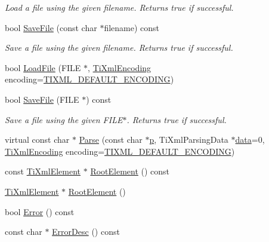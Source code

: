 \begin{DoxyCompactItemize}
\begin{DoxyCompactList}\small\item\em Load a file using the given filename. Returns true if successful. \end{DoxyCompactList}\item 
bool \hyperlink{class_ti_xml_document_ae869f5ebf7fc54c4a1d737fb4689fd44}{Save\-File} (const char $\ast$filename) const 
\begin{DoxyCompactList}\small\item\em Save a file using the given filename. Returns true if successful. \end{DoxyCompactList}\item 
bool \hyperlink{class_ti_xml_document_a41f6fe7200864d1dca663d230caf8db6}{Load\-File} (F\-I\-L\-E $\ast$, \hyperlink{tinyxml_8h_a88d51847a13ee0f4b4d320d03d2c4d96}{Ti\-Xml\-Encoding} encoding=\hyperlink{tinyxml_8h_ad5b8b092878e9010d6400cb6c13d4879}{T\-I\-X\-M\-L\-\_\-\-D\-E\-F\-A\-U\-L\-T\-\_\-\-E\-N\-C\-O\-D\-I\-N\-G})
\item 
bool \hyperlink{class_ti_xml_document_acf1672b4538c6d1d441f9f108aea2bf4}{Save\-File} (F\-I\-L\-E $\ast$) const 
\begin{DoxyCompactList}\small\item\em Save a file using the given F\-I\-L\-E$\ast$. Returns true if successful. \end{DoxyCompactList}\item 
virtual const char $\ast$ \hyperlink{class_ti_xml_document_a17ebabe36926ef398e78dec0d0ad0378}{Parse} (const char $\ast$\hyperlink{glew_8h_aa5367c14d90f462230c2611b81b41d23}{p}, Ti\-Xml\-Parsing\-Data $\ast$\hyperlink{fmod__codec_8h_a42c2b1d86fa71a425e73a882cb0a72c8}{data}=0, \hyperlink{tinyxml_8h_a88d51847a13ee0f4b4d320d03d2c4d96}{Ti\-Xml\-Encoding} encoding=\hyperlink{tinyxml_8h_ad5b8b092878e9010d6400cb6c13d4879}{T\-I\-X\-M\-L\-\_\-\-D\-E\-F\-A\-U\-L\-T\-\_\-\-E\-N\-C\-O\-D\-I\-N\-G})
\item 
const \hyperlink{class_ti_xml_element}{Ti\-Xml\-Element} $\ast$ \hyperlink{class_ti_xml_document_ad09d17927f908f40efb406af2fb873be}{Root\-Element} () const 
\item 
\hyperlink{class_ti_xml_element}{Ti\-Xml\-Element} $\ast$ \hyperlink{class_ti_xml_document_a0b43e762a23f938b06651bc90b8a1013}{Root\-Element} ()
\item 
bool \hyperlink{class_ti_xml_document_a6dfc01a6e5d58e56acd537dfd3bdeb29}{Error} () const 
\item 
const char $\ast$ \hyperlink{class_ti_xml_document_a9d0f689f6e09ea494ea547be8d79c25e}{Error\-Desc} () const 

\end{DoxyCompactItemize}
